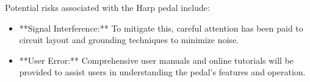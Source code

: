 Potential risks associated with the Harp pedal include:
\begin{itemize}
\item **Signal Interference:** To mitigate this, careful attention has been paid to circuit layout and grounding techniques to minimize noise.
\item **User Error:** Comprehensive user manuals and online tutorials will be provided to assist users in understanding the pedal's features and operation.
\end{itemize}
